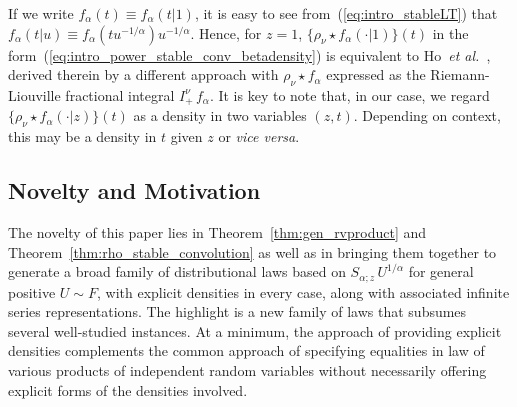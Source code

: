 \documentclass[a4paper,12pt]{article}
\begin{document}
If we write $f_\alpha(t)\equiv f_\alpha(t\vert 1)$,  it is easy to  see from~(\ref{eq:intro_stableLT})  that 
$f_\alpha(t\vert u) \equiv f_\alpha(t u^{-1/\alpha}) u^{-1/\alpha}$. 
Hence, for  $z=1$, $\{\rho_\nu\star f_\alpha(\cdot\vert 1) \}(t)$  in the form~(\ref{eq:intro_power_stable_conv_betadensity}) 
is   equivalent  to  Ho~{\it  et al.}~\cite[Proposition~2.2($iii$)]{HoJamesLau}, derived therein by a different approach 
with $\rho_\nu\star f_\alpha$ expressed as  the  Riemann-Liouville fractional integral  $I_+^\nu\, f_\alpha$.
It is key to note that, in our case,  we  regard $\{\rho_\nu\star f_\alpha(\cdot\vert z) \}(t)$ as a density  in two variables $(z,t)$.
Depending on context, this may be a density in $t$ given $z$ or {\it vice versa}.
 
\subsection{Novelty and Motivation}
\label{sec:novelty}

The novelty of this paper  lies in Theorem~\ref{thm:gen_rvproduct}  and Theorem~\ref{thm:rho_stable_convolution}
as well as in   bringing them together 
to generate a broad family of distributional laws based on $S_{\alpha;z} \, U^{1/\alpha}$  for general positive
$U\sim F$, %
with explicit densities %
in every case,
along with associated infinite series representations.
The   highlight is a new family of laws  that subsumes several well-studied instances.
At a minimum, the  approach of providing explicit densities complements the common approach of specifying equalities in law 
of various products of  independent random variables without  necessarily offering explicit forms of the densities involved.
\end{document}
